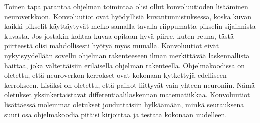 \documentclass[11pt]{article}
\begin{document}
Toinen tapa parantaa ohjelman toimintaa olisi ollut konvoluutioden lisääminen neuroverkkoon. Konvoluutiot ovat hyödyllisiä kuvantunnistuksessa, koska kuvan kaikki pikselit käyttäytyvät melko samalla tavalla riippumatta pikselin sijainnista kuvasta. Jos jostakin kohtaa kuvaa opitaan hyvä piirre, kuten reuna, tästä piirteestä olisi mahdollisesti hyötyä myös muualla. Konvoluutiot eivät nykyisyydellään sovellu ohjelman rakenteeseen ilman merkittävää laskennallista haittaa, joka vältettäisiin erilaisella ohjelman rakenteella. Ohjelmakoodissa on oletettu, että neuroverkon kerrokset ovat kokonaan kytkettyjä edelliseen kerrokseen. Lisäksi on oletettu, että painot liittyvät vain yhteen neuroniin. Nämä oletukset yksinkertaistavat differentiaalilaskennan matematiikkaa. Konvoluutiot lisättäessä molemmat oletukset jouduttaisiin hylkäämään, minkä seurauksena suuri osa ohjelmakoodia pitäisi kirjoittaa ja testata kokonaan uudelleen.
\end{document}
